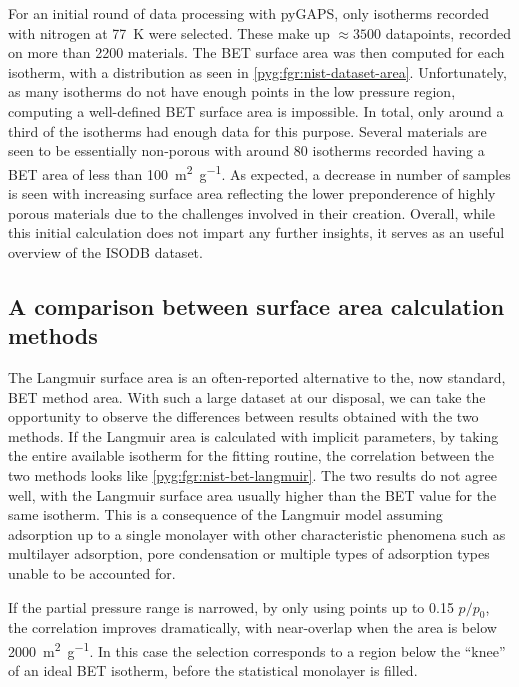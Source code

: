 For an initial round of data processing with pyGAPS,
only isotherms recorded with nitrogen at \SI{77}{\kelvin}
were selected. These make up \(\approx \! 3500\) datapoints,
recorded on more than 2200 materials. The BET surface area
was then computed for each isotherm, with a distribution
as seen in \autoref{pyg:fgr:nist-dataset-area}.
Unfortunately, as many isotherms do not have enough points
in the low pressure region, computing a well-defined
BET surface area is impossible. In total, only around a
third of the isotherms had enough data for this purpose.
Several materials are seen to be essentially non-porous
with around 80 isotherms recorded having a BET area of less
than \SI{100}{\metre^2\per\gram}. As expected, a decrease in
number of samples is seen with increasing surface area
reflecting the lower preponderence of highly porous
materials due to the challenges involved in their
creation. Overall, while this initial calculation does
not impart any further insights, it serves as an useful overview
of the ISODB dataset.

\subsection{A comparison between surface area calculation methods}

The Langmuir surface area is an often-reported alternative
to the, now standard, BET method area.
With such a large dataset at our disposal, we can take
the opportunity to observe the differences between results
obtained with the two methods.
If the Langmuir area is calculated with implicit parameters,
by taking the entire available isotherm for the fitting
routine, the correlation between the two methods looks
like \autoref{pyg:fgr:nist-bet-langmuir}. The two results
do not agree well, with the Langmuir surface
area usually higher than the BET value for the
same isotherm. This is a consequence of the Langmuir model
assuming adsorption up to a single monolayer with other
characteristic phenomena such as multilayer adsorption,
pore condensation or multiple types of adsorption types
unable to be accounted for.

If the partial pressure range is narrowed, by only using
points up to 0.15 \(p/p_0\), the correlation improves
dramatically, with near-overlap when the area is below
\SI{2000}{\metre^2\per\gram}. In this case the selection corresponds
to a region below the ``knee'' of an ideal BET isotherm,
before the statistical monolayer is filled.

